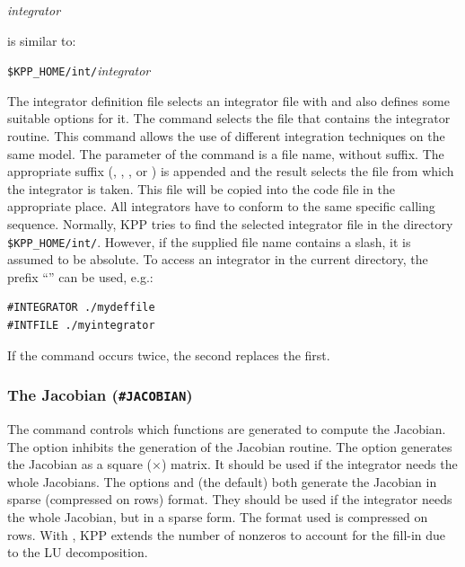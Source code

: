 \documentclass[twoside]{article}
\begin{document}
 {\it integrator}

is similar to:

 \verb|$KPP_HOME/int/|{\it integrator}

The integrator definition file selects an integrator file with
 and also defines some suitable options for it. The
 command selects the file that contains the integrator
routine. This command allows the use of different integration techniques
on the same model. The parameter of the command is a file name, without
suffix. The appropriate suffix (, , , or
) is appended and the result selects the file from which the
integrator is taken. This file will be copied into the code file in the
appropriate place. All integrators have to conform to the same specific
calling sequence. Normally, KPP tries to find the selected integrator
file in the directory \verb|$KPP_HOME/int/|. However, if the supplied
file name contains a slash, it is assumed to be absolute. To access an
integrator in the current directory, the prefix ``'' can be
used, e.g.:
%
\begin{verbatim}
#INTEGRATOR ./mydeffile
#INTFILE ./myintegrator
\end{verbatim}
%
If the  command occurs twice, the second replaces the
first.

\subsubsection{The Jacobian ({\tt\#JACOBIAN})}
\label{sec:command-jacobian}

The  command controls which functions are generated to
compute the Jacobian. The option  inhibits the generation of
the Jacobian routine. The option  generates the Jacobian as a
square ($\times$) matrix. It should be used if the
integrator needs the whole Jacobians. The options  and
 (the default) both generate the Jacobian in sparse
(compressed on rows) format.  They should be used if the integrator
needs the whole Jacobian, but in a sparse form. The format used is
compressed on rows. With , KPP extends the number of
nonzeros to account for the fill-in due to the LU decomposition.
\end{document}
